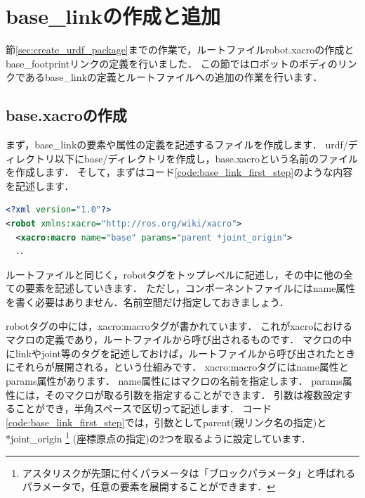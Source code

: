 \documentclass[{../../master}]{subfiles}
\begin{document}
\section{\textsf{base\_link}の作成と追加}

節\ref{sec:create_urdf_package}までの作業で，ルートファイル\textsf{robot.xacro}の作成と\textsf{base\_footprint}リンクの定義を行いました．
この節ではロボットのボディのリンクである\textsf{base\_link}の定義とルートファイルへの追加の作業を行います．

\subsection{\textsf{base.xacro}の作成}

まず，\textsf{base\_link}の要素や属性の定義を記述するファイルを作成します．
\textsf{urdf/}ディレクトリ以下に\textsf{base/}ディレクトリを作成し，\textsf{base.xacro}という名前のファイルを作成します．
そして，まずはコード\ref{code:base_link_first_step}のような内容を記述します．

\begin{lstlisting}[language=XML, caption=\textsf{base.xacro}, label=code:base_link_first_step]
<?xml version="1.0"?>
<robot xmlns:xacro="http://ros.org/wiki/xacro">
  <xacro:macro name="base" params="parent *joint_origin">
  ．．
\end{lstlisting}

ルートファイルと同じく，\textsf{robot}タグをトップレベルに記述し，その中に他の全ての要素を記述していきます．
ただし，コンポーネントファイルには\textsf{name}属性を書く必要はありません．名前空間だけ指定しておきましょう．

\textsf{robot}タグの中には，\textsf{xacro:macro}タグが書かれています．
これが\textsf{xacro}におけるマクロの定義であり，ルートファイルから呼び出されるものです．
マクロの中に\textsf{link}や\textsf{joint}等のタグを記述しておけば，ルートファイルから呼び出されたときにそれらが展開される，という仕組みです．
\textsf{xacro:macro}タグには\textsf{name}属性と\textsf{params}属性があります．
\textsf{name}属性にはマクロの名前を指定します．
\textsf{params}属性には，そのマクロが取る引数を指定することができます．
引数は複数設定することができ，半角スペースで区切って記述します．
コード\ref{code:base_link_first_step}では，引数として\textsf{parent}(親リンク名の指定)と\textsf{*joint\_origin}
\footnote{アスタリスクが先頭に付くパラメータは「ブロックパラメータ」と呼ばれるパラメータで，任意の要素を展開することができます．}
(座標原点の指定)の2つを取るように設定しています．
\end{document}
